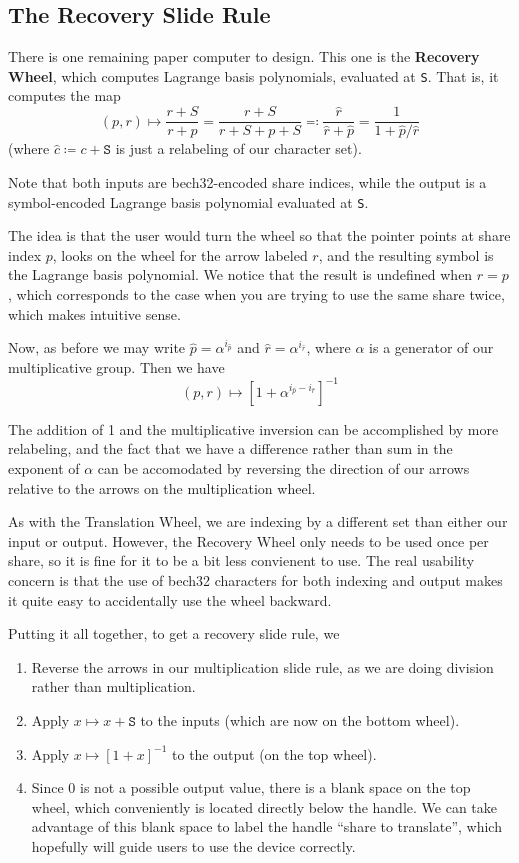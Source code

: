 \documentclass[letterpaper]{article}
\newcommand{\vc}[1]{\texttt{#1}} %
\begin{document}
\subsection{The Recovery Slide Rule}

There is one remaining paper computer to design. This one is the \textbf{Recovery
Wheel}, which computes Lagrange basis polynomials, evaluated at \vc{S}. That is,
it computes the map
\[ (p, r) \mapsto \frac{r + S}{r + p} = \frac{r + S}{r + S + p + S} \eqqcolon \frac{\hat{r}}{\hat{r}+\hat{p}} = \frac{1}{1 + \hat{p}/\hat{r}} \]
(where $\hat{c}\coloneqq c+\vc{S}$ is just a relabeling of our character set).

Note that both inputs are bech32-encoded share indices, while the output is
a symbol-encoded Lagrange basis polynomial evaluated at \vc{S}.

The idea is that the user would turn the wheel so that the pointer points at
share index $p$, looks on the wheel for the arrow labeled $r$, and the resulting
symbol is the Lagrange basis polynomial. We notice that the result is undefined
when $r = p$, which corresponds to the case when you are trying to use the same
share twice, which makes intuitive sense.

Now, as before we may write $\hat{p}=\alpha^{i_{\hat{p}}}$ and
$\hat{r}=\alpha^{i_{\hat{r}}}$, where $\alpha$ is a generator of our multiplicative
group. Then we have
\[ (p, r) \mapsto \left[ 1 + \alpha^{i_{\hat{p}} - i_{\hat{r}}} \right]^{-1} \]

The addition of 1 and the multiplicative inversion can be accomplished by more
relabeling, and the fact that we have a difference rather than sum in the exponent
of $\alpha$ can be accomodated by reversing the direction of our arrows relative
to the arrows on the multiplication wheel.

As with the Translation Wheel, we are indexing by a different set than either
our input or output. However, the Recovery Wheel only needs to be used once per
share, so it is fine for it to be a bit less convienent to use. The real usability
concern is that the use of bech32 characters for both indexing and output makes
it quite easy to accidentally use the wheel backward.

Putting it all together, to get a recovery slide rule, we
\begin{enumerate}
\item Reverse the arrows in our multiplication slide rule, as we are doing
division rather than multiplication.
\item Apply $x\mapsto x+\vc{S}$ to the inputs (which are now on the bottom
wheel).
\item Apply $x\mapsto[1+x]^{-1}$ to the output (on the top wheel).
\item Since 0 is not a possible output value, there is a blank space on the top
wheel, which conveniently is located directly below the handle. We can take
advantage of this blank space to label the handle ``share to translate'', which
hopefully will guide users to use the device correctly.
\end{enumerate}
\end{document}
